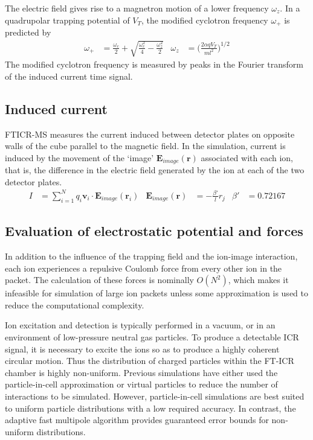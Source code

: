 \documentclass[10pt,conference,onecolumn]{IEEEtran}
\begin{document}
The electric field gives rise to a magnetron motion of a lower frequency $\omega_z$.
In a quadrupolar trapping potential of $V_T$, the modified cyclotron frequency $\omega_+$ is predicted by
\begin{align}
\omega_+ &= \frac{\omega_c}{2} + \sqrt{\frac{\omega_c^2}{4} - \frac{\omega_z^2}{2}} &
\omega_z &= \biggl(\frac{2 \alpha q V_T}{m l^2}\biggr)^{1/2}
\end{align}
The modified cyclotron frequency is measured by peaks in the Fourier transform of the induced current time signal.

\subsection{Induced current}

FTICR-MS measures the current induced between detector plates on opposite walls of the cube parallel to the magnetic field.
In the simulation, current is induced by the movement of the `image' $\mathbf{E}_{image}(\mathbf{r})$ associated with each ion, that is, the difference in the electric field generated by the ion at each of the two detector plates\cite{Guan1995}.
\begin{align}
I &= \sum_{i=1}^N q_i\mathbf{v}_i \cdot \mathbf{E}_{image}(\mathbf{r}_i) & \mathbf{E}_{image}(\mathbf{r}) &= - \frac{\beta'}{l} r_j & \beta' &= 0.72167
\end{align}

\subsection{Evaluation of electrostatic potential and forces}

In addition to the influence of the trapping field and the ion-image interaction, each ion experiences a repulsive Coulomb force from every other ion in the packet.
The calculation of these forces is nominally $O(N^2)$, which makes it infeasible for simulation of large ion packets unless some approximation is used to reduce the computational complexity.

Ion excitation and detection is typically performed in a vacuum, or in an environment of low-pressure neutral gas particles.
To produce a detectable ICR signal, it is necessary to excite the ions so as to produce a highly coherent circular motion.
Thus the distribution of charged particles within the FT-ICR chamber is highly non-uniform.
Previous simulations have either used the particle-in-cell approximation\cite{Leach2009} or virtual particles to reduce the number of interactions to be simulated\cite{Fujiwara2010}.
However, particle-in-cell simulations are best suited to uniform particle distributions with a low required accuracy\cite{Greengard1989}.
In contrast, the adaptive fast multipole algorithm\cite{Cheng1999} provides guaranteed error bounds for non-uniform distributions.
\end{document}

